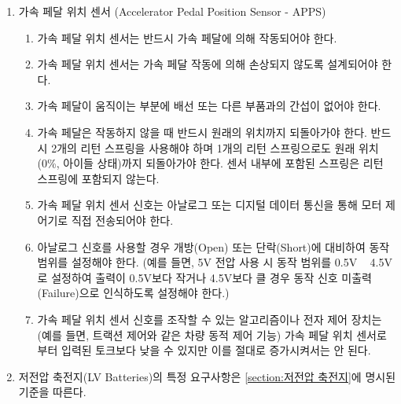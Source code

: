\documentclass[final,a4paper,10pt]{report}
\begin{document}
\begin{enumerate}
  \item 가속 페달 위치 센서 (Accelerator Pedal Position Sensor - APPS)
    \begin{enumerate}
      \item 가속 페달 위치 센서는 반드시 가속 페달에 의해 작동되어야 한다.
      \item 가속 페달 위치 센서는 가속 페달 작동에 의해 손상되지 않도록 설계되어야 한다.
      \item 가속 페달이 움직이는 부분에 배선 또는 다른 부품과의 간섭이 없어야 한다.
      \item 가속 페달은 작동하지 않을 때 반드시 원래의 위치까지 되돌아가야 한다. 반드시 2개의 리턴 스프링을 사용해야 하며 1개의 리턴 스프링으로도 원래 위치(0\%, 아이들 상태)까지 되돌아가야 한다. 센서 내부에 포함된 스프링은 리턴 스프링에 포함되지 않는다.
      \item 가속 페달 위치 센서 신호는 아날로그 또는 디지털 데이터 통신을 통해 모터 제어기로 직접 전송되어야 한다.
      \item 아날로그 신호를 사용할 경우 개방(Open) 또는 단락(Short)에 대비하여 동작 범위를 설정해야 한다. (예를 들면, 5V 전압 사용 시 동작 범위를 0.5V \string~ 4.5V로 설정하여 출력이 0.5V보다 작거나 4.5V보다 클 경우 동작 신호 미출력(Failure)으로 인식하도록 설정해야 한다.)
      \item 가속 페달 위치 센서 신호를 조작할 수 있는 알고리즘이나 전자 제어 장치는 (예를 들면, 트랙션 제어와 같은 차량 동적 제어 기능) 가속 페달 위치 센서로부터 입력된 토크보다 낮을 수 있지만 이를 절대로 증가시켜서는 안 된다.
    \end{enumerate}
  \item 저전압 축전지(LV Batteries)의 특정 요구사항은 \cref{section:저전압 축전지}에 명시된 기준을 따른다.
\end{enumerate}
\end{document}
